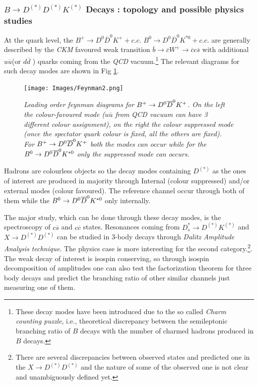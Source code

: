 \documentclass[paper=a4, fontsize=10pt]{scrartcl}
\numberwithin{equation}{section}		%
\numberwithin{figure}{section}			%
\numberwithin{table}{section}				%
\begin{document}
\subsubsection{${ B }\rightarrow { D }^{ (*)} { D }^{ (*) } { K }^{ (*) }$ Decays : topology and possible physics studies}

At the quark level, the  $B^{+}\rightarrow D^{0} \overline{D}^{0} K^{+} +c.c.$ 
$B^{0}\rightarrow D^{0} \overline{D}^{0} K^{\ast 0}  +  c.c.$ are generally described by the \textit{CKM} favoured weak transition $\overline{b} \rightarrow \overline{c} W^{+} \rightarrow \overline{c} c \overline{s}$ with additional $u\overline{u}$(or $d\overline{d} $ ) quarks coming from the \textit{QCD} vacuum.\footnote{These decay modes have been introduced due to the so called \textit{Charm counting puzzle}, i.e., theoretical discrepancy between the semileptonic branching ratio of $B$ decays with the number of charmed hadrons produced in $B$  decays.}  The relevant diagrams for such decay modes are shown in Fig \ref{quarks}.
\begin{figure}[h!]
\begin{center}
\texttt{[image: Images/Feynman2.png]}
\caption{\textit{Leading order feynman diagrams for $B^{+} \rightarrow D^0 \overline{D}^{0} K^{+}$. On the left the colour-favoured mode ($u\overline{u}$ from \textit{QCD} vacuum can have 3 different colour assignment), on the right the colour suppressed mode (once the spectator quark colour is fixed, all the others are fixed). For $B^{+} \rightarrow D^0 \overline{D}^{0} K^{+}$ both the modes can occur while for the $B^{0} \rightarrow D^0 \overline{D}^{0} K^{\ast 0}$ only the suppressed mode can occurs.}}\label{quarks}
\end{center}
\end{figure}


Hadrons are colourless objects so the decay modes containing $D^{(\ast)}$ as the ones of interest are produced in majority through Internal (colour suppressed) and/or external modes (colour favoured). The reference channel occur through both of them while the $B^{0} \rightarrow D^0 \overline{D}^{0} K^{\ast 0}$ only internally.

The major study, which can be done through these decay modes, is the spectroscopy of $c\overline{s} $ and $c\overline{c}$ states. Resonances coming from  $D^{\ast}_{s} \rightarrow D^{(\ast)} K^{(\ast)}$ and  $X \rightarrow D^{(\ast)}D^{(\ast)}$ can be studied in 3-body decays through \textit{Dalitz Amplitude Analysis technique}. The physics case is more interesting for the second category.\footnote{ There are several discrepancies between observed states and predicted one in the $X \rightarrow D^{(\ast)}D^{(\ast)}$ and the nature of some of the observed one is not clear and unambiguously defined yet.}.
The weak decay of interest is isospin conserving, so through isospin decomposition of amplitudes one can also test the factorization theorem for three body decays and predict the branching ratio of other similar channels just measuring one of them.
\end{document}
